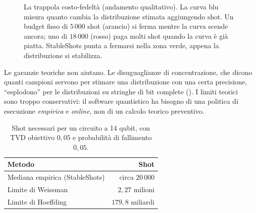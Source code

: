\begin{figure}[ht]
\centering
{}
\caption{La trappola costo-fedeltà (andamento qualitativo). La curva blu misura quanto cambia la distribuzione stimata
aggiungendo shot. Un budget fisso di $5\,000$ shot (arancio) si ferma mentre la curva scende ancora; uno di $18\,000$
(rosso) paga molti shot quando la curva è già piatta. StableShots punta a fermarsi nella zona verde, appena la
distribuzione si stabilizza.}
\label{fig:qse-trappola}
\end{figure}

Le garanzie teoriche non aiutano. Le disuguaglianze di concentrazione, che dicono quanti campioni servono per stimare
una distribuzione con una certa precisione, ``esplodono'' per le distribuzioni su stringhe di bit complete
(). I limiti teorici sono troppo conservativi: il software quantistico ha bisogno di una politica
di esecuzione \emph{empirica} e \emph{online}, non di un calcolo teorico preventivo.

\begin{table}[ht]
\centering
\small
\caption{Shot necessari per un circuito a 14 qubit, con TVD obiettivo $0{,}05$ e probabilità di fallimento $0{,}05$.}
\label{tab:qse-bound}
\begin{tabular}{lr}
\toprule
Metodo & Shot \\
\midrule
Mediana empirica (StableShots) & circa $20\,000$ \\
Limite di Weissman & $2{,}27$ milioni \\
Limite di Hoeffding & $179{,}8$ miliardi \\
\bottomrule
\end{tabular}
\end{table}

